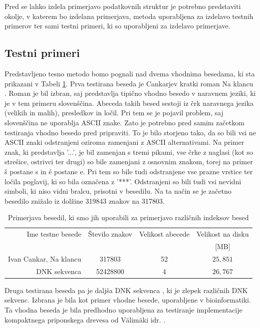 Pred se lahko izdela primerjavo podatkovnih struktur je potrebno predstaviti okolje, v katerem bo izdelana primerjava, metoda uporabljena za izdelavo testnih primerov ter sami testni primeri, ki so uporabljeni za izdelavo primerjave. 

\subsection{Testni primeri}

Predstavljeno tesno metodo bomo pognali nad dvema vhodnima besedama, ki sta prikazani v Tabeli \ref{tab:besedila}. Prva testirana beseda je Cankarjev kratki roman Na klancu \cite{podatkiNaKlancu}. Roman je bil izbran, saj predstavlja tipično vhodno besedo v naravnem jeziki, ki je v tem primeru slovenščina. Abeceda takih besed sestoji iz črk naravnega jezika (velikih in malih), presledkov in ločil. Pri tem se je pojavil problem, saj slovenščina ne uporablja ASCII znake. Zato je potrebno pred samim začetkom testiranja vhodno besedo pred pripraviti. To je bilo storjeno tako, da so bili vsi ne ASCII znaki odstranjeni oziroma zamenjani z ASCII alternativami. Na primer znak, ki predstavlja '...', je bil zamenjan s tremi pikami, vse črke z naglasi (kot so strešice, ostrivci ter drugi) so bile zamenjani z osnovnim znakom, torej na primer š postane s in é postane e. Pri tem so bile tudi odstranjene vse prazne vrstice ter ločila poglavij, ki so bila označena z '***'. Odstranjeni so bili tudi vsi nevidni simboli, ki niso vidni bralcu, prisotni v besedilu. Na ta način se je začetno besedilo znižalo iz dolžine 319843 znakov na 317803.

\begin{table}[htb]
    \caption{Primerjava besedil, ki smo jih uporabili za primerjavo različnih indeksov besed}
    \label{tab:besedila}
    \centering
    \begin{tabular}{rccc}
        Ime testne besede& Število znakov & Velikost abecede & Velikost na disku \\
        &  &   & [MB]\\
         \hline
        Ivan Cankar, Na klancu \cite{podatkiNaKlancu}& 317803 & 52 & $25,851$ \\
        DNK sekvenca \cite{podatki}&  52428800& 4 & $26,767$ \\
    \end{tabular}    
\end{table}

Druga testirana beseda pa je daljša DNK sekvenca \cite{podatki}, ki je zlepek različnih DNK sekvenc. Izbrana je bila kot primer vhodne besede, uporabljene v bioinformatiki. Ta vhodna beseda je bila predhodno uporabljena za testiranje implementacije kompaktnega priponskega drevesa od Välimäki idr. \cite{Valimaki2007}.

